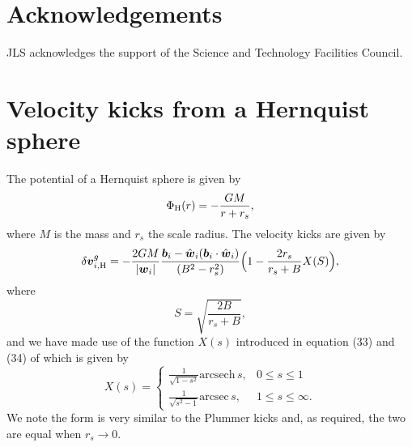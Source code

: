 \documentclass[useAMS,usenatbib,fleqn,a4paper]{mn2e}
\newcommand{\bs}[1]{\bmath{#1}}
\begin{document}
\section*{Acknowledgements}
JLS acknowledges the support of the Science and Technology Facilities
Council.




\appendix
\section{Velocity kicks from a Hernquist sphere}\label{App::Hernquist}

The potential of a Hernquist sphere \citep{Hernquist1990} is given by
\begin{equation}
\Phi_{\rm H}(r) = -\frac{GM}{r+r_s},
\end{equation}
where $M$ is the mass and $r_s$ the scale radius. The velocity kicks are given by
\begin{equation}
\delta\bs{v}^{g}_{i,\mathrm{H}} = -\frac{2GM}{|\bs{w}_i|}
\frac{\bs{b}_i-\hat{\bs{w}}_i(\bs{b}_i\cdot\hat{\bs{w}}_i)}
{(B^2-r_s^2)}\Big(1-\frac{2r_s}{r_s+B}X(S)\Big),
\label{curved_hernquist}
\end{equation}
where
\begin{equation}
S=\sqrt{\frac{2B}{r_s+B}},
\end{equation}
and we have made use of the function $X(s)$ introduced in equation (33) and (34) of \cite{Hernquist1990} which is given by
\begin{equation}
X(s)=\begin{cases}
    \frac{1}{\sqrt{1-s^2}}\mathrm{arcsech}\,s,& 0\leq s\leq 1\\
    \frac{1}{\sqrt{s^2-1}}\mathrm{arcsec}\,s, & 1\leq s\leq \infty.
\end{cases}
\end{equation}
We note the form is very similar to the Plummer kicks and, as required, the two are equal when $r_s\rightarrow0$.
\end{document}

